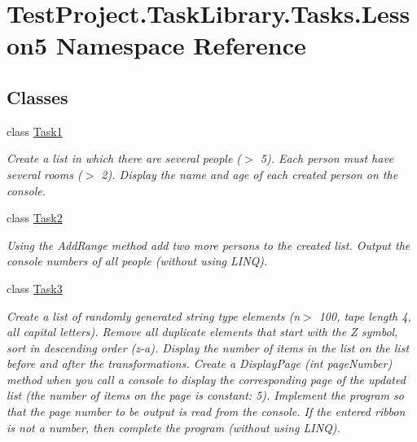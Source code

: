\hypertarget{namespace_test_project_1_1_task_library_1_1_tasks_1_1_lesson5}{}\section{Test\+Project.\+Task\+Library.\+Tasks.\+Lesson5 Namespace Reference}
\label{namespace_test_project_1_1_task_library_1_1_tasks_1_1_lesson5}
\subsection*{Classes}
\begin{DoxyCompactItemize}
\item 
class \mbox{\hyperlink{class_test_project_1_1_task_library_1_1_tasks_1_1_lesson5_1_1_task1}{Task1}}
\begin{DoxyCompactList}\small\item\em Create a list in which there are several people ($>$ 5). Each person must have several rooms ($>$ 2). Display the name and age of each created person on the console. \end{DoxyCompactList}\item 
class \mbox{\hyperlink{class_test_project_1_1_task_library_1_1_tasks_1_1_lesson5_1_1_task2}{Task2}}
\begin{DoxyCompactList}\small\item\em Using the Add\+Range method add two more persons to the created list. Output the console numbers of all people (without using L\+I\+NQ). \end{DoxyCompactList}\item 
class \mbox{\hyperlink{class_test_project_1_1_task_library_1_1_tasks_1_1_lesson5_1_1_task3}{Task3}}
\begin{DoxyCompactList}\small\item\em Create a list of randomly generated string type elements (n$>$ 100, tape length 4, all capital letters). Remove all duplicate elements that start with the \textquotesingle{}Z\textquotesingle{} symbol, sort in descending order (z-\/a). Display the number of items in the list on the list before and after the transformations. Create a Display\+Page (int page\+Number) method when you call a console to display the corresponding page of the updated list (the number of items on the page is constant\+: 5). Implement the program so that the page number to be output is read from the console. If the entered ribbon is not a number, then complete the program (without using L\+I\+NQ). \end{DoxyCompactList}\end{DoxyCompactItemize}
